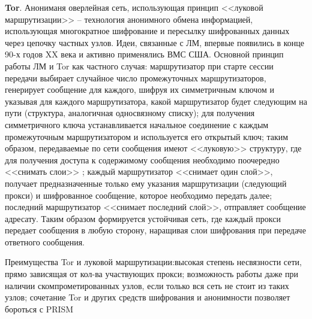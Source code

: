 \textbf{Tor}. Анониманя оверлейная сеть, использующая принцип <<луковой маршрутизации>> -- технология анонимного обмена информацией, использующая многократное шифрование и пересылку шифрованных данных через цепочку частных узлов. Идеи, связанные с ЛМ, впервые появились в конце 90-х годов XX века и активно применялись ВМС США. Основной принцип работы ЛМ и Tor как частного случая: маршрутизатор при старте сессии  передачи выбирает случайное число промежуточных маршрутизаторов, генерирует сообщение для каждого, шифруя их симметричным ключом и указывая для каждого маршрутизатора, какой маршрутизатор будет следующим на пути (структура, аналогичная односвязному списку); для получения симметричного ключа устанавливается начальное соединение с каждым промежуточным маршрутизатором и используется его открытый ключ; таким образом, передаваемые по сети сообщения имеют <<луковую>> структуру, где для получения доступа к содержимому сообщения необходимо поочередно <<снимать слои>> ; каждый маршрутизатор <<снимает один слой>>, получает предназначенные только ему указания маршрутизации (следующий прокси) и шифрованное сообщение, которое необходимо передать далее; последний маршрутизатор <<снимает последний слой>>, отправляет сообщение адресату. Таким образом формируется устойчивая сеть, где каждый прокси передает сообщения в любую сторону, наращивая слои шифрования при передаче ответного сообщения. %

Преимущества Tor и луковой маршрутизации:высокая степень несвязности сети, прямо зависящая от кол-ва участвующих прокси; возможность работы даже при наличии скомпрометированных узлов, если только вся сеть не стоит из таких узлов; сочетание Tor и других средств шифрования и анонимности позволяет бороться с PRISM %


\newpage 